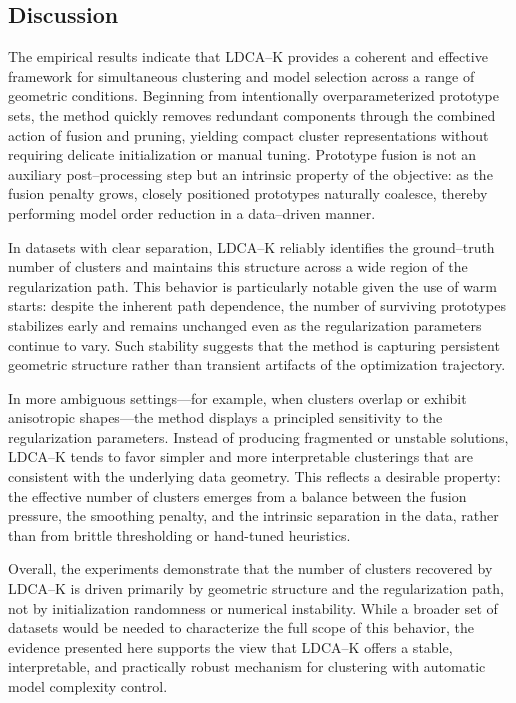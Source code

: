 \documentclass[11pt]{article}
\theoremstyle{definition}
\newcommand{\1}{\mathbf{1}}
\begin{document}
\subsection{Discussion}

The empirical results indicate that LDCA--K provides a coherent and effective
framework for simultaneous clustering and model selection across a range of
geometric conditions. Beginning from intentionally overparameterized prototype
sets, the method quickly removes redundant components through the combined
action of fusion and pruning, yielding compact cluster representations without
requiring delicate initialization or manual tuning. Prototype fusion is not an
auxiliary post--processing step but an intrinsic property of the objective: as
the fusion penalty grows, closely positioned prototypes naturally coalesce,
thereby performing model order reduction in a data--driven manner.

In datasets with clear separation, LDCA--K reliably identifies the ground--truth
number of clusters and maintains this structure across a wide region of the
regularization path. This behavior is particularly notable given the use of
warm starts: despite the inherent path dependence, the number of surviving
prototypes stabilizes early and remains unchanged even as the regularization
parameters continue to vary. Such stability suggests that the method is
capturing persistent geometric structure rather than transient artifacts of the
optimization trajectory.

In more ambiguous settings---for example, when clusters overlap or exhibit
anisotropic shapes---the method displays a principled sensitivity to the
regularization parameters. Instead of producing fragmented or unstable
solutions, LDCA--K tends to favor simpler and more interpretable clusterings
that are consistent with the underlying data geometry. This reflects a desirable
property: the effective number of clusters emerges from a balance between the
fusion pressure, the smoothing penalty, and the intrinsic separation in the
data, rather than from brittle thresholding or hand-tuned heuristics.

Overall, the experiments demonstrate that the number of clusters recovered by
LDCA--K is driven primarily by geometric structure and the regularization path,
not by initialization randomness or numerical instability. While a broader set
of datasets would be needed to characterize the full scope of this behavior,
the evidence presented here supports the view that LDCA--K offers a stable,
interpretable, and practically robust mechanism for clustering with automatic
model complexity control.
\end{document}
